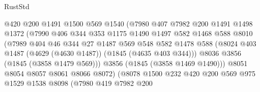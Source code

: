 \begin{lexlean}{RustStd}
\begin{coremodule}
                              @420
                              @200
                              @1491
                              @1500
                              @569
                              @1540
                              (@7980
                                @407
                                @7982
                                @200
                                @1491
                                @1498
                                @1372
                                (@7990
                                  @406
                                  @344
                                  @353
                                  @1175
                                  @1490
                                  @1497
                                  @582
                                  @1468
                                  @588
                                  @8010
                                  (@7989
                                    @404
                                    @46
                                    @344
                                    @27
                                    @1487
                                    @569
                                    @548
                                    @582
                                    @1478
                                    @588
                                    (@8024
                                      @403
                                      @1487
                                      (@4629 (@4630 @1487))
                                      (@1845 (@4635 @403 @344)))
                                    @8036
                                    @3856
                                    (@1845 (@3858 @1479 @569)))
                                  @3856
                                  (@1845 (@3858 @1469 @1490)))
                                @8051
                                @8054
                                @8057
                                @8061
                                @8066
                                @8072)
                              (@8078
                                @1500
                                @232
                                @420
                                @200
                                @569
                                @975
                                @1529
                                @1538
                                @8098
                                (@7980
                                  @419
                                  @7982
                                  @200

\end{coremodule}
\end{lexlean}
